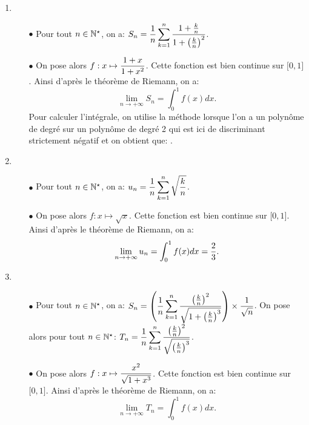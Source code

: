 \documentclass[a4paper, 11pt,reqno]{article}
\begin{document}
\begin{correction}\;
	\begin{enumerate}
		\item
		      \begin{itemize}
			      \item[$\bullet$] Pour tout $n\in\mathbb{N}^{\star}$, on a: $S_n=\displaystyle\frac{1}{n}\sum\limits_{k=1}^n \displaystyle\frac{1+\frac{k}{n}}{ 1+\left( \frac{k}{n} \right)^2}$.
			      \item[$\bullet$] On pose alors $f: x\mapsto \displaystyle\frac{1+x}{1+x^2}$. Cette fonction est bien continue sur $\lbrack 0,1\rbrack$. Ainsi d'apr\`{e}s le th\'eor\`{e}me de Riemann, on a:
			            $$\lim\limits_{n\to +\infty} S_n=\int_0^1 f(x)dx.$$
			            Pour calculer l'int\'egrale, on utilise la m\'ethode lorsque l'on a un polyn\^{o}me de degr\'e sur un polyn\^{o}me de degr\'e 2  qui est ici de discriminant strictement n\'egatif et on obtient que: .
		      \end{itemize}
		\item
		      \begin{itemize}
			      \item[$\bullet$] Pour tout $n\in\mathbb{N}^{\star}$, on a: $u_n=\displaystyle\frac{1}{n}\sum\limits_{k=1}^n \displaystyle\sqrt{\displaystyle\frac{k}{n}}$.
			      \item[$\bullet$] On pose alors $f: x\mapsto \sqrt{x}$. Cette fonction est bien continue sur $\lbrack 0,1\rbrack$. Ainsi d'apr\`{e}s le th\'eor\`{e}me de Riemann, on a:
			            $$\lim\limits_{n\to +\infty} u_n=\int_0^1 f(x)dx=\displaystyle\frac{2}{3}.$$
		      \end{itemize}
		\item
		      \begin{itemize}
			      \item[$\bullet$] Pour tout $n\in\mathbb{N}^{\star}$, on a: $S_n=\left(\displaystyle\frac{1}{n}\sum\limits_{k=1}^n \displaystyle\frac{\left(\frac{k}{n}\right)^2}{\sqrt{ 1+\left( \frac{k}{n} \right)^3} }\right)\times \displaystyle\frac{1}{\sqrt{n}}$. On pose alors pour tout $n\in\mathbb{N}^{\star}$: $T_n=\displaystyle\frac{1}{n}\sum\limits_{k=1}^n \displaystyle\frac{\left(\frac{k}{n}\right)^2}{\sqrt{ \left( \frac{k}{n} \right)^3}}$.
			      \item[$\bullet$] On pose alors $f: x\mapsto \displaystyle\frac{x^2}{\sqrt{1+x^3}}$. Cette fonction est bien continue sur $\lbrack 0,1\rbrack$. Ainsi d'apr\`{e}s le th\'eor\`{e}me de Riemann, on a:
			            $$\lim\limits_{n\to +\infty} T_n=\int_0^1 f(x)dx.$$

\end{itemize}
\end{enumerate}
\end{correction}
\end{document}
